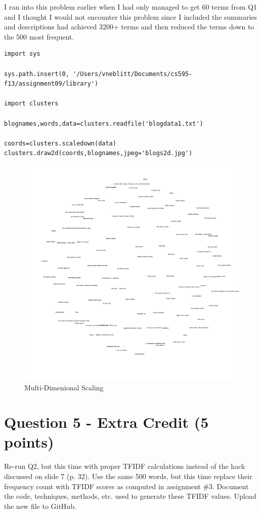 \documentclass{article}
\begin{document}
I ran into this problem earlier when I had only managed to get 60 terms from Q1 and I thought I would not encounter this problem since I included the summaries and descriptions had achieved 3200+ terms and then reduced the terms down to the 500 most frequent.

\begin{lstlisting}[frame=single, caption=getMDS.py, label=getMDS]
import sys

sys.path.insert(0, '/Users/vneblitt/Documents/cs595-f13/assignment09/library')

import clusters

blognames,words,data=clusters.readfile('blogdata1.txt')

coords=clusters.scaledown(data)
clusters.draw2d(coords,blognames,jpeg='blogs2d.jpg')
\end{lstlisting}

\begin{figure}[H]
\centering
\includegraphics[scale=0.20]{q04/blogs2d}
\caption{Multi-Dimenional Scaling}
\label{blogs2d}
\end{figure}

\newpage
\section*{Question 5 - Extra Credit (5 points)}
Re-run Q2, but this time with proper TFIDF calculations instead of the hack discussed on slide 7 (p. 32). Use the same 500 words, but this time replace their frequency count with TFIDF scores as computed in assignment \#3. Document the code, techniques, methods, etc. used to generate these TFIDF values. Upload the new file to GitHub. \\
\end{document}
